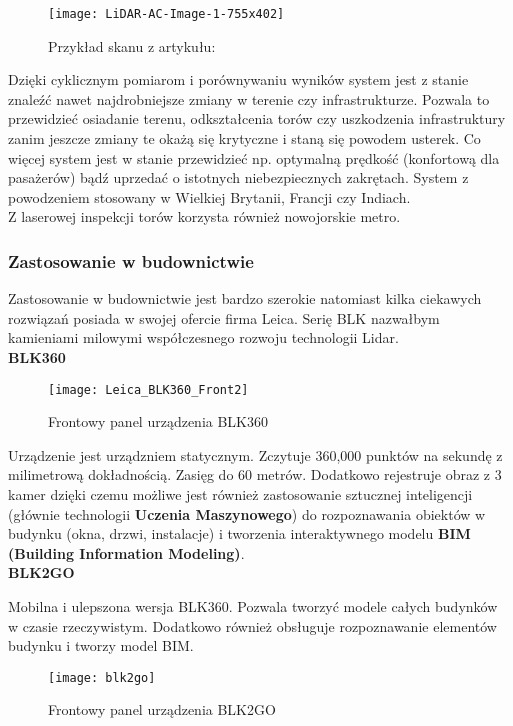 \begin{figure}[h]
    \centering
    \texttt{[image: LiDAR-AC-Image-1-755x402]}
    \caption{Przykład skanu z artykułu: \cite{tory}}
    \label{fig:tory}
\end{figure}

Dzięki cyklicznym pomiarom i porównywaniu wyników system jest z stanie znaleźć nawet najdrobniejsze zmiany w terenie czy infrastrukturze. Pozwala to przewidzieć osiadanie terenu, odkształcenia torów czy uszkodzenia infrastruktury zanim jeszcze zmiany te okażą się krytyczne i staną się powodem usterek. Co więcej system jest w stanie przewidzieć np. optymalną prędkość (konfortową dla pasażerów) bądź uprzedać o istotnych niebezpiecznych zakrętach. System z powodzeniem stosowany w Wielkiej Brytanii, Francji czy Indiach.\\

Z laserowej inspekcji torów korzysta również nowojorskie metro.

\subsubsection{Zastosowanie w budownictwie}
Zastosowanie w budownictwie jest bardzo szerokie natomiast kilka ciekawych rozwiązań posiada w swojej ofercie firma Leica. Serię BLK nazwałbym kamieniami milowymi współczesnego rozwoju technologii Lidar.\\

\textbf{BLK360}

\begin{figure}[h]
    \centering
    \texttt{[image: Leica\_BLK360\_Front2]}
    \caption{Frontowy panel urządzenia BLK360 \cite{blk360}}
    \label{fig:blk360}
\end{figure}

Urządzenie jest urządzniem statycznym. Zczytuje 360,000 punktów na sekundę z milimetrową dokładnością. Zasięg do 60 metrów. Dodatkowo rejestruje obraz z 3 kamer dzięki czemu możliwe jest również zastosowanie sztucznej inteligencji (głównie technologii \textbf{Uczenia Maszynowego}) do rozpoznawania obiektów w budynku (okna, drzwi, instalacje) i tworzenia interaktywnego modelu \textbf{BIM (Building Information Modeling)}.\\

\textbf{BLK2GO}

Mobilna i ulepszona wersja BLK360. Pozwala tworzyć modele całych budynków w czasie rzeczywistym. Dodatkowo również obsługuje rozpoznawanie elementów budynku i tworzy model BIM.\\
\begin{figure}[h]
    \centering
    \texttt{[image: blk2go]}
    \caption{Frontowy panel urządzenia BLK2GO \cite{blk2go}}
    \label{fig:blk2go}
\end{figure}

